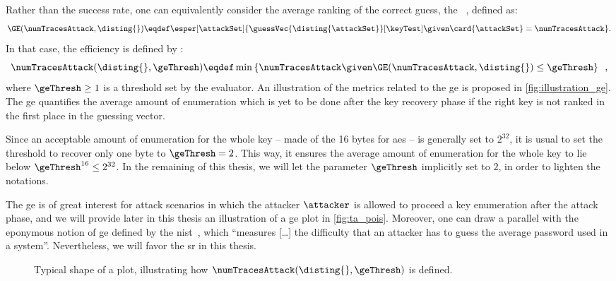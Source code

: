\begin{remark}
    Rather than the success rate, one can equivalently consider the average ranking of the correct guess, \aka{} the ~\cite{standaert_unified_2009}, defined as:
    \begin{equation}
        \GE(\numTracesAttack, \disting{}) \eqdef 
        \esper[\attackSet]{\guessVec{\disting{\attackSet}}[\keyTest] \given \card{\attackSet} = \numTracesAttack}.
        \label{eq:GE}
    \end{equation}
    In that case, the efficiency is defined by :
    \begin{equation}
        \numTracesAttack(\disting{}, \geThresh) \eqdef \min \left\{\numTracesAttack \given \GE(\numTracesAttack, \disting{}) \leq \geThresh \right\} \enspace ,
        \label{eq:eff_ge}
    \end{equation}
    where \(\geThresh \geq 1\) is a threshold set by the evaluator.
    An illustration of the metrics related to the \gls{ge} is proposed in \autoref{fig:illustration_ge}.
    The \gls{ge} quantifies the average amount of enumeration which is yet to be done after the key recovery phase if the right key is not ranked in the first place in the guessing vector.
    
    Since an acceptable amount of enumeration for the whole key -- \ie{} made of the 16 bytes for \gls{aes} -- is generally set to \(2^{32}\), it is usual to set the threshold to recover only one byte to \(\geThresh = 2\).
    This way, it ensures the average amount of enumeration for the whole key to lie below \(\geThresh^{16} \leq 2^{32}\).
    In the remaining of this thesis, we will let the parameter \(\geThresh\) implicitly set to \(2\), in order to lighten the notations.
    
    The \gls{ge} is of great interest for attack scenarios in which the attacker \(\attacker\) is allowed to proceed a key enumeration after the attack phase, and we will provide later in this thesis an illustration of a \gls{ge} plot in \autoref{fig:ta_pois}.
    Moreover, one can draw a parallel with the eponymous notion of \gls{ge} defined by the \gls{nist}~\cite{nist_auth_guidelines_2006}, which
    ``measures [\ldots] the difficulty that an attacker has to guess the average password used in a system''.
    Nevertheless, we will favor the \gls{sr} in this thesis.
    \begin{figure}
        \centering
        
        \caption{Typical shape of a  plot, illustrating how \(\numTracesAttack(\disting{}, \geThresh)\) is defined.}
        \label{fig:illustration_ge}
    \end{figure}
\end{remark}

